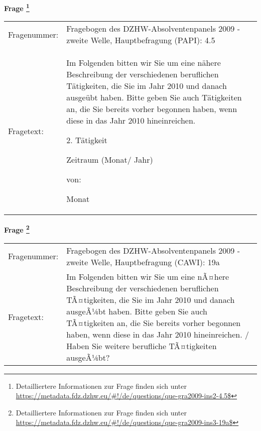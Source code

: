 				\vspace*{0.5cm}
                \noindent\textbf{Frage
	                \footnote{Detailliertere Informationen zur Frage finden sich unter
		              \url{https://metadata.fdz.dzhw.eu/\#!/de/questions/que-gra2009-ins2-4.5$}}}\\
				\begin{tabularx}{\hsize}{@{}lX}
					Fragenummer: &
					  Fragebogen des DZHW-Absolventenpanels 2009 - zweite Welle, Hauptbefragung (PAPI):
					  4.5
 \\
					Fragetext: & Im Folgenden bitten wir Sie um eine nähere Beschreibung der verschiedenen beruflichen Tätigkeiten, die Sie im Jahr 2010 und danach ausgeübt haben. Bitte geben Sie auch Tätigkeiten an, die Sie bereits vorher begonnen haben, wenn diese in das Jahr 2010 hineinreichen.\par  2. Tätigkeit\par  Zeitraum (Monat/ Jahr)\par  von:\par  Monat \\
				\end{tabularx}
				\vspace*{0.5cm}
                \noindent\textbf{Frage
	                \footnote{Detailliertere Informationen zur Frage finden sich unter
		              \url{https://metadata.fdz.dzhw.eu/\#!/de/questions/que-gra2009-ins3-19a$}}}\\
				\begin{tabularx}{\hsize}{@{}lX}
					Fragenummer: &
					  Fragebogen des DZHW-Absolventenpanels 2009 - zweite Welle, Hauptbefragung (CAWI):
					  19a
 \\
					Fragetext: & Im Folgenden bitten wir Sie um eine nÃ¤here Beschreibung der verschiedenen beruflichen TÃ¤tigkeiten, die Sie im Jahr 2010 und danach ausgeÃ¼bt haben. Bitte geben Sie auch TÃ¤tigkeiten an, die Sie bereits vorher begonnen haben, wenn diese in das Jahr 2010 hineinreichen. / Haben Sie weitere berufliche TÃ¤tigkeiten ausgeÃ¼bt? \\
				\end{tabularx}





